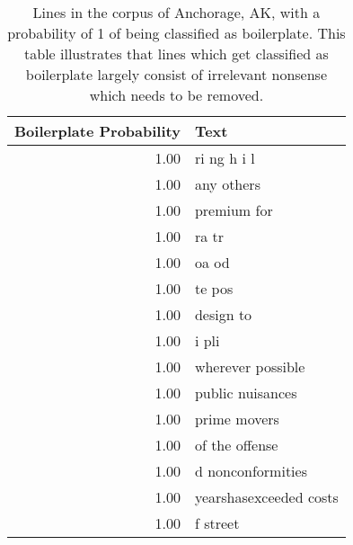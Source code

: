 \begin{table}[ht]
\centering
\begingroup\small
\begin{tabular}{rl}
  \hline
Boilerplate Probability & Text \\ 
  \hline
1.00 & ri ng h i l \\ 
  1.00 & any others \\ 
  1.00 & premium for \\ 
  1.00 & ra tr \\ 
  1.00 & oa od \\ 
  1.00 & te pos \\ 
  1.00 & design to \\ 
  1.00 & i pli \\ 
  1.00 & wherever possible \\ 
  1.00 & public nuisances \\ 
  1.00 & prime movers \\ 
  1.00 & of the offense \\ 
  1.00 & d nonconformities \\ 
  1.00 & yearshasexceeded costs \\ 
  1.00 & f street \\ 
   \hline
\end{tabular}
\endgroup
\caption{Lines in the corpus of Anchorage, AK, with a probability of 1 of being classified as boilerplate. This table illustrates that lines which get classified as boilerplate largely consist of irrelevant nonsense which needs to be removed.} 
\label{tabBoilerplateIllustration}
\end{table}

